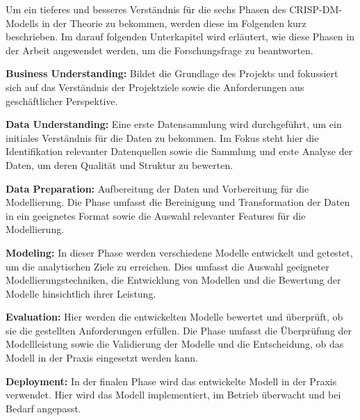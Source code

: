 Um ein tieferes und besseres Verständnis für die sechs Phasen des CRISP-DM-Modells in der Theorie zu bekommen, werden diese im Folgenden kurz beschrieben. Im darauf folgenden Unterkapitel wird erläutert, wie diese Phasen in der Arbeit angewendet werden, um die Forschungsfrage zu beantworten.

\textbf{Business Understanding:} Bildet die Grundlage des Projekts und fokussiert sich auf das Verständnis der Projektziele sowie die Anforderungen aus geschäftlicher Perspektive.

\textbf{Data Understanding:} Eine erste Datensammlung wird durchgeführt, um ein initiales Verständnis für die Daten zu bekommen. Im Fokus steht hier die Identifikation relevanter Datenquellen sowie die Sammlung und erste Analyse der Daten, um deren Qualität und Struktur zu bewerten.

\textbf{Data Preparation:} Aufbereitung der Daten und Vorbereitung für die Modellierung. Die Phase umfasst die Bereinigung und Transformation der Daten in ein geeignetes Format sowie die Auswahl relevanter Features für die Modellierung.

\textbf{Modeling:} In dieser Phase werden verschiedene Modelle entwickelt und getestet, um die analytischen Ziele zu erreichen. Dies umfasst die Auswahl geeigneter Modellierungstechniken, die Entwicklung von Modellen und die Bewertung der Modelle hinsichtlich ihrer Leistung.

\textbf{Evaluation:} Hier werden die entwickelten Modelle bewertet und überprüft, ob sie die gestellten Anforderungen erfüllen. Die Phase umfasst die Überprüfung der Modellleistung sowie die Validierung der Modelle und die Entscheidung, ob das Modell in der Praxis eingesetzt werden kann.

\textbf{Deployment:} In der finalen Phase wird das entwickelte Modell in der Praxis verwendet. Hier wird das Modell implementiert, im Betrieb überwacht und bei Bedarf angepasst.